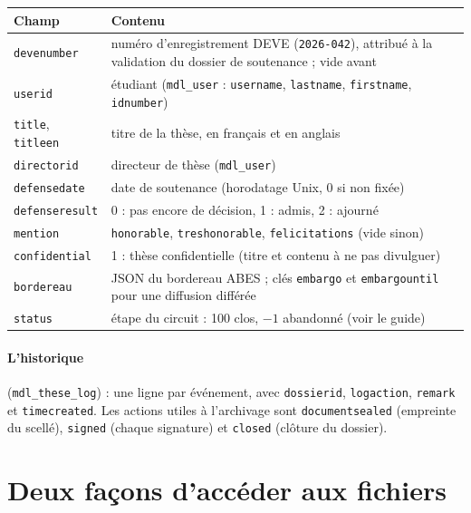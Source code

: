 \documentclass[11pt,a4paper]{article}
\begin{document}
\begin{center}
\small
\begin{tabularx}{\linewidth}{@{}l X@{}}
\toprule
\textbf{Champ} & \textbf{Contenu} \\
\midrule
\texttt{devenumber} & numéro d'enregistrement DEVE (\texttt{2026-042}), attribué à la validation du
dossier de soutenance ; vide avant \\
\texttt{userid} & étudiant (\texttt{mdl\_user} : \texttt{username}, \texttt{lastname},
\texttt{firstname}, \texttt{idnumber}) \\
\texttt{title}, \texttt{titleen} & titre de la thèse, en français et en anglais \\
\texttt{directorid} & directeur de thèse (\texttt{mdl\_user}) \\
\texttt{defensedate} & date de soutenance (horodatage Unix, 0 si non fixée) \\
\texttt{defenseresult} & 0 : pas encore de décision, 1 : admis, 2 : ajourné \\
\texttt{mention} & \texttt{honorable}, \texttt{treshonorable}, \texttt{felicitations} (vide sinon) \\
\texttt{confidential} & 1 : thèse confidentielle (titre et contenu à ne pas divulguer) \\
\texttt{bordereau} & JSON du bordereau ABES ; clés \texttt{embargo} et \texttt{embargountil} pour
une diffusion différée \\
\texttt{status} & étape du circuit : 100 clos, $-1$ abandonné (voir le guide) \\
\bottomrule
\end{tabularx}
\end{center}

\paragraph{L'historique} (\texttt{mdl\_these\_log}) : une ligne par événement, avec
\texttt{dossierid}, \texttt{logaction}, \texttt{remark} et \texttt{timecreated}. Les actions utiles à
l'archivage sont \texttt{documentsealed} (empreinte du scellé), \texttt{signed} (chaque signature) et
\texttt{closed} (clôture du dossier).

\section{Deux façons d'accéder aux fichiers}\label{sec:acces}
\end{document}
